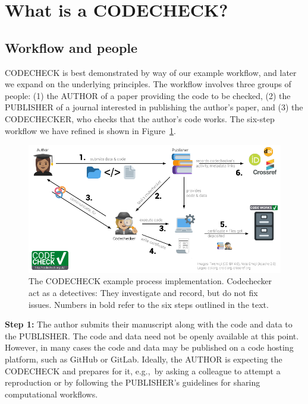 \documentclass[12pt]{article}
\begin{document}
\section*{What is a CODECHECK?}\label{what-is-a-codecheck}

\subsection*{Workflow and people}\label{workflow-people}

CODECHECK is best demonstrated by way of our example workflow, and later
we expand on the underlying principles. The workflow involves three
groups of people:
(1) the AUTHOR of a paper providing the code to be checked,
(2) the PUBLISHER of a journal interested in publishing the author's paper, and
(3) the CODECHECKER, who checks that the author's code works.
The six-step workflow we have refined is shown in Figure~\ref{fig:workflow}.

\begin{figure}
  \centering
      \includegraphics[width=\textwidth]{figs/codecheck_overview.pdf}
      \caption{The CODECHECK example process implementation.
        Codechecker act as a detectives: They investigate and record,
        but do not fix issues.  Numbers in bold refer to the six steps
        outlined in the text.}
  \label{fig:workflow}
\end{figure}

\textbf{Step 1:} The author submits their manuscript along with the code and data to the PUBLISHER.
The code and data need not be openly available at this point.
However, in many cases the code and data may be published on a code hosting platform,
such as GitHub or GitLab. Ideally, the AUTHOR is expecting the CODECHECK and
prepares for it, e.g.,~by asking a colleague to attempt a reproduction or by 
following the PUBLISHER's guidelines for sharing computational workflows.
\end{document}
